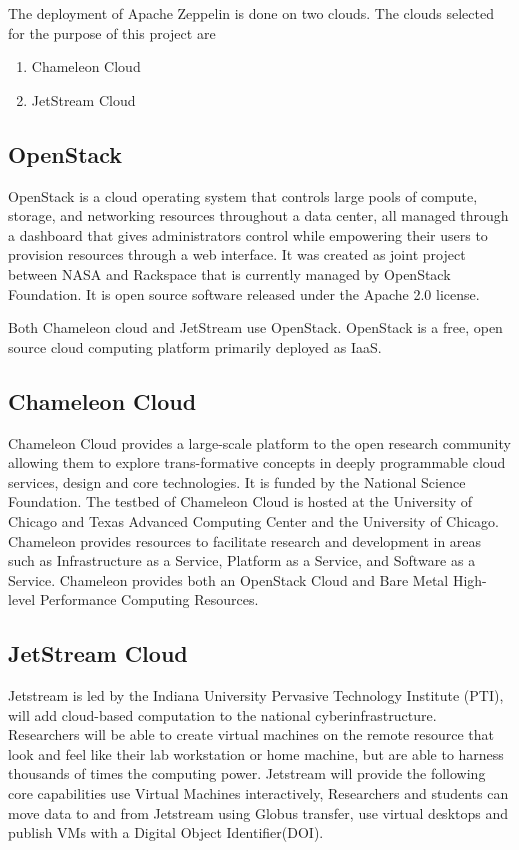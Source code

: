 \documentclass[9pt,twocolumn,twoside]{../../styles/osajnl}
\begin{document}
	The deployment of Apache Zeppelin is done on two clouds. The 
	clouds 
	selected for the purpose of this project are
	\begin{enumerate}
		\item Chameleon Cloud
		\item JetStream Cloud
	\end{enumerate}
	
	\subsection{OpenStack}
	
	OpenStack\cite{www-openstack} is a cloud operating system that 
	controls large pools of compute, storage, and networking 
	resources 
	throughout a data center, all managed through a dashboard that 
	gives 
	administrators control while empowering their users to provision 
	resources through a web interface. It was created as joint 
	project 
	between NASA and Rackspace that is currently managed by OpenStack 
	Foundation. It is open source software released under the Apache 
	2.0 
	license.
	
	Both Chameleon cloud and JetStream use OpenStack. OpenStack is a 
	free, open source cloud computing platform primarily deployed as 
	IaaS.\cite{www-laas}
	
	\subsection{Chameleon Cloud}
	
	Chameleon Cloud\cite{www-cc} provides a large-scale platform to 
	the 
	open research community allowing them to explore trans-formative 
	concepts in deeply programmable cloud services, design and core 
	technologies. It is funded by the National Science Foundation. 
	The 
	testbed of Chameleon Cloud is hosted at the University of Chicago 
	and 
	Texas Advanced Computing Center and the University of Chicago. 
	Chameleon provides resources to facilitate research and 
	development 
	in areas such as Infrastructure as a Service, Platform as a 
	Service, 
	and Software as a Service. Chameleon provides both an OpenStack 
	Cloud 
	and Bare Metal High-level Performance Computing 
	Resources\cite{www-bmhlpc}.
	
	\subsection{JetStream Cloud}
	
	Jetstream is led by the Indiana University Pervasive Technology 
	Institute (PTI), will add cloud-based computation to the national 
	cyberinfrastructure. Researchers will be able to create virtual 
	machines on the remote resource that look and feel like their lab 
	workstation or home machine, but are able to harness thousands of 
	times the computing power. Jetstream will provide the following 
	core 
	capabilities use Virtual Machines interactively, Researchers and 
	students can move data to and from Jetstream using {Globus 
		transfer}\cite{www-gt}, use virtual desktops and publish VMs 
		with a 
	Digital Object Identifier(DOI)\cite{www-doi}.
	
\end{document}
